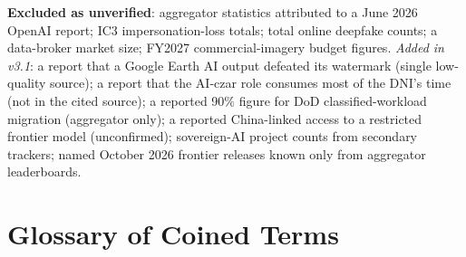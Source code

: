 \documentclass[11pt,letterpaper]{article}
\begin{document}
{\raggedright \textbf{Excluded as unverified}: aggregator statistics attributed to a June 2026 OpenAI report; IC3 impersonation-loss totals; total online deepfake counts; a data-broker market size; FY2027 commercial-imagery budget figures. \textit{Added in v3.1}: a report that a Google Earth AI output defeated its watermark (single low-quality source); a report that the AI-czar role consumes most of the DNI's time (not in the cited source); a reported 90\% figure for DoD classified-workload migration (aggregator only); a reported China-linked access to a restricted frontier model (unconfirmed); sovereign-AI project counts from secondary trackers; named October 2026 frontier releases known only from aggregator leaderboards.\par}

\section{Glossary of Coined Terms}
\end{document}
